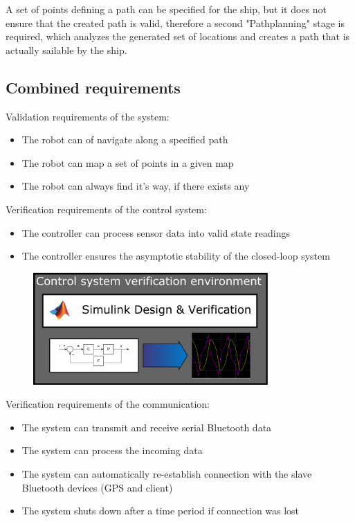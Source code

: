 A set of points defining a path can be specified for the ship, but it does not ensure that the created path is valid, therefore a second "Pathplanning" stage is required, which analyzes the generated set of locations and creates a path that is actually sailable by the ship.

\subsection{Combined requirements}

Validation requirements of the system:

\begin{itemize}

\item The robot can of navigate along a specified path
\item The robot can map a set of points in a given map
\item The robot can always find it’s way, if there exists any

\end{itemize}

Verification requirements of the control system:

\begin{itemize}

\item The controller can process sensor data into valid state readings
\item The controller ensures the asymptotic stability of the closed-loop system 

\end{itemize}

\begin{figure}[H]
	\centering
	\includegraphics[width=0.8\textwidth]{img2/SimVer}
	\caption{}
	\label{}
\end{figure}

Verification requirements of the communication:

\begin{itemize}

\item The system can transmit and receive serial Bluetooth data
\item The system can process the incoming data
\item The system can automatically re-establish connection with the slave Bluetooth devices (GPS and client)
\item The system shuts down after a time period if connection was lost

\end{itemize}

